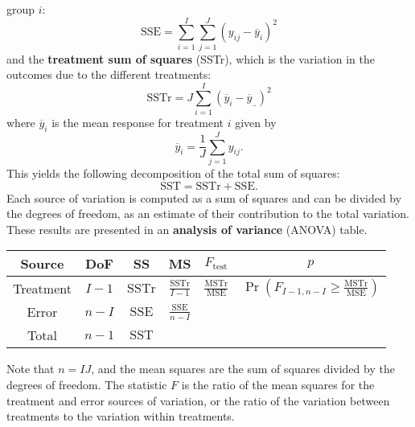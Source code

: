 \documentclass{article}
\begin{document}
group \(i\):
\begin{equation*}
    \mathrm{SSE} = \sum_{i = 1}^I \sum_{j = 1}^J \left( y_{ij} - \overline{y}_i \right)^2
\end{equation*}
and the \textbf{treatment sum of squares} (SSTr), which is the variation in the outcomes due to the different treatments:
\begin{equation*}
    \mathrm{SSTr} = J \sum_{i = 1}^I \left( \overline{y}_i - \overline{y}_{..} \right)^2
\end{equation*}
where \(\overline{y}_i\) is the mean response for treatment \(i\) given by
\begin{equation*}
    \overline{y}_i = \frac{1}{J} \sum_{j = 1}^J y_{ij}.
\end{equation*}
This yields the following decomposition of the total sum of squares:
\begin{equation*}
    \mathrm{SST} = \mathrm{SSTr} + \mathrm{SSE}.
\end{equation*}
Each source of variation is computed as a sum of squares and can be divided by the degrees of freedom,
as an estimate of their contribution to the total variation. These results are presented in an
\textbf{analysis of variance} (ANOVA) table.
\begin{table}[H]
    \centering
    \begin{tabular}{c c c c c c}
        \toprule
        \textbf{Source} & \textbf{DoF} & \textbf{SS}       & \textbf{MS}                     & \(F_{\mathrm{test}}\)                  & \(p\)                                                                            \\
        \midrule
        Treatment       & \(I - 1\)    & \(\mathrm{SSTr}\) & \(\frac{\mathrm{SSTr}}{I - 1}\) & \(\frac{\mathrm{MSTr}}{\mathrm{MSE}}\) & \(\Pr{\left( F_{I - 1, n - I} \geq \frac{\mathrm{MSTr}}{\mathrm{MSE}} \right)}\) \\ [0.15in]
        Error           & \(n - I\)    & \(\mathrm{SSE}\)  & \(\frac{\mathrm{SSE}}{n - I}\)  &                                                                                                                           \\ [0.15in]
        Total           & \(n - 1\)    & \(\mathrm{SST}\)  &                                 &                                                                                                                           \\
        \bottomrule
    \end{tabular}
\end{table}
Note that \(n = IJ\), and the mean squares are the sum of squares divided by the degrees of freedom.
The statistic \(F\) is the ratio of the mean squares for the treatment and error sources of variation,
or the ratio of the variation between treatments to the variation within treatments.
\end{document}
